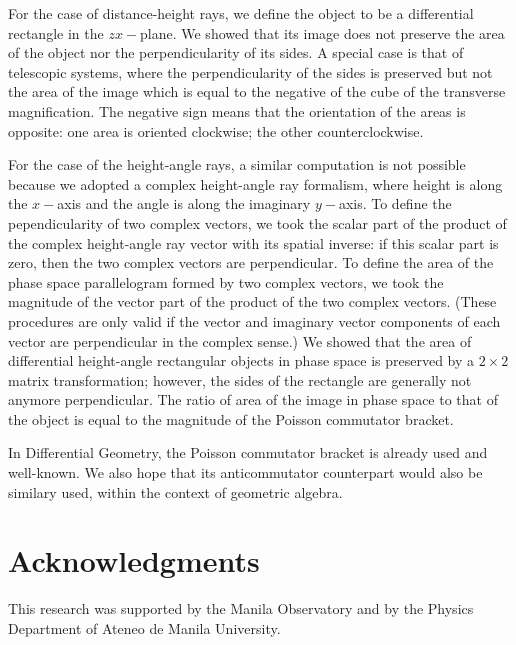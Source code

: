 \documentclass[11pt,twocolumn]{article}
\begin{document}
For the case of distance-height rays, we define the object to be a differential rectangle in the $zx-$plane.  We showed that its image  does not preserve the area of the object nor the perpendicularity of its sides.  A special case is that of telescopic systems, where the perpendicularity of the sides is preserved but not the area of the image which is equal to the negative of the cube of the transverse magnification.  The negative sign means that the orientation of the areas is opposite: one area is oriented clockwise; the other counterclockwise.

For the case of the height-angle rays, a similar computation is not possible because we adopted a complex height-angle ray formalism, where height is along the $x-$axis and the angle is along the imaginary $y-$axis.  To define the pependicularity of two complex vectors, we took the scalar part of the product of the complex height-angle ray vector with its spatial inverse: if this scalar part is zero, then the two complex vectors are perpendicular.  To define the area of the phase space parallelogram formed by two complex vectors, we took the magnitude of the vector part of the product of the two complex vectors.  (These procedures are only valid if the vector and imaginary vector components of each vector are perpendicular in the complex sense.)  We showed that the area of differential height-angle rectangular objects in phase space is preserved by a $2\times 2$ matrix transformation; however, the sides of the rectangle are generally not anymore perpendicular.  The ratio of area of the image in phase space to that of the object is equal to the magnitude of the Poisson commutator bracket.

In Differential Geometry, the Poisson commutator bracket is already used and well-known. We also hope that its anticommutator counterpart would also be similary used, within the context of geometric algebra.

\section*{\small{Acknowledgments}}
This research was supported by the Manila Observatory and by the Physics Department of Ateneo de Manila University.
\end{document}
